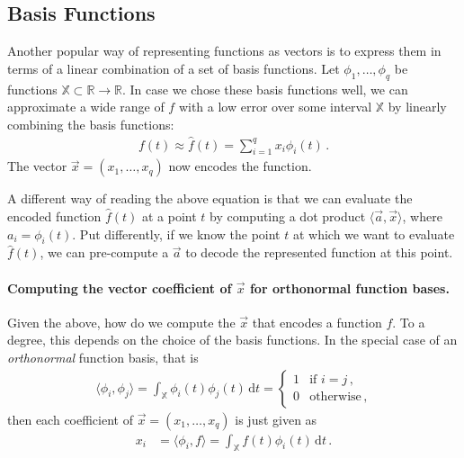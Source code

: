 \documentclass[10pt,letterpaper,oneside]{article}
\begin{document}
\subsection{Basis Functions}

Another popular way of representing functions as vectors is to express them in terms of a linear combination of a set of basis functions. Let $\phi_1, \ldots, \phi_q$ be functions $\mathbb{X} \subset \mathbb{R} \longrightarrow \mathbb{R}$. In case we chose these basis functions well, we can approximate a wide range of $f$ with a low error over some interval $\mathbb{X}$ by linearly combining the basis functions:
\begin{align}
	f(t) \approx \hat f(t) = \sum_{i = 1}^q x_i \phi_i(t) \,.
	\label{eqn:eval_f}
\end{align}
The vector $\vec x = (x_1, \ldots, x_q)$ now encodes the function.

A different way of reading the above equation is that we can evaluate the encoded function $\hat f(t)$ at a point $t$ by computing a dot product $\langle \vec a, \vec x \rangle$, where $a_i = \phi_i(t)$. Put differently, if we know the point $t$ at which we want to evaluate $\hat f(t)$, we can pre-compute a $\vec a$ to decode the represented function at this point.

\paragraph{Computing the vector coefficient of $\vec x$ for orthonormal function bases.}
Given the above, how do we compute the $\vec x$ that encodes a function $f$. To a degree, this depends on the choice of the basis functions. In the special case of an \emph{orthonormal} function basis, that is
\begin{align*}
	\langle \phi_i, \phi_j \rangle = \int_{\mathbb{X}} \phi_i(t) \phi_j(t) \, \mathrm{d}t = \begin{cases}
		1 & \text{if } i = j \,,\\
		0 & \text{otherwise} \,,
	\end{cases}
\end{align*}
then each coefficient of $\vec x = (x_1, \ldots, x_q)$ is just given as
\begin{align}
	x_i &= \langle \phi_i, f \rangle = \int_{\mathbb{X}} f(t) \phi_i(t) \, \mathrm{d}t \,.
	\label{eqn:ortho_transform}
\end{align}
\vspace*{-0.4cm}
\end{document}
